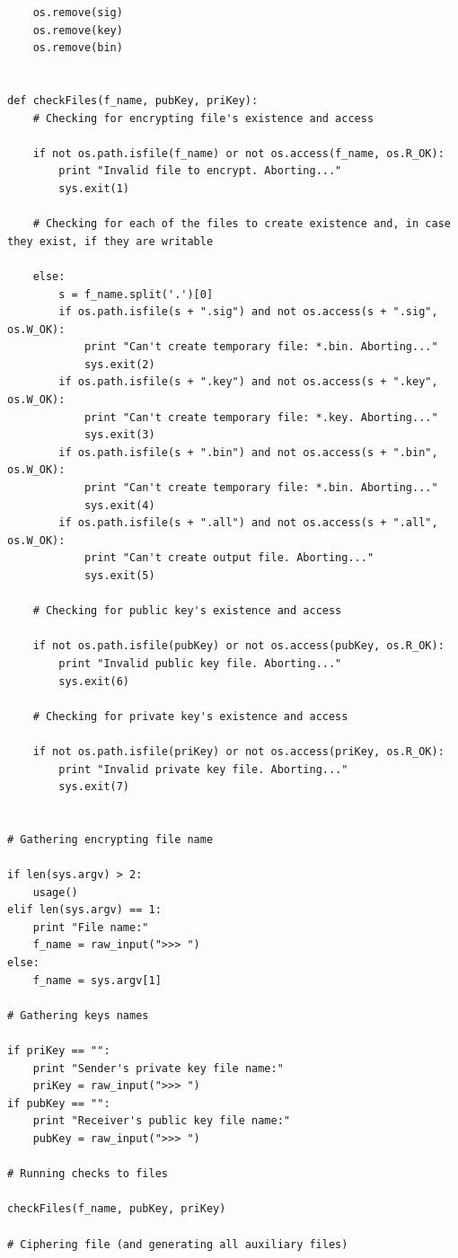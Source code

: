 \documentclass[a4paper,11pt,openright,oneside]{report}
\begin{document}
\begin{appendices}
\begin{verbatim}
    os.remove(sig)
    os.remove(key)
    os.remove(bin)


def checkFiles(f_name, pubKey, priKey):
    # Checking for encrypting file's existence and access

    if not os.path.isfile(f_name) or not os.access(f_name, os.R_OK):
        print "Invalid file to encrypt. Aborting..."
        sys.exit(1)

    # Checking for each of the files to create existence and, in case they exist, if they are writable

    else:
        s = f_name.split('.')[0]
        if os.path.isfile(s + ".sig") and not os.access(s + ".sig", os.W_OK):
            print "Can't create temporary file: *.bin. Aborting..."
            sys.exit(2)
        if os.path.isfile(s + ".key") and not os.access(s + ".key", os.W_OK):
            print "Can't create temporary file: *.key. Aborting..."
            sys.exit(3)
        if os.path.isfile(s + ".bin") and not os.access(s + ".bin", os.W_OK):
            print "Can't create temporary file: *.bin. Aborting..."
            sys.exit(4)
        if os.path.isfile(s + ".all") and not os.access(s + ".all", os.W_OK):
            print "Can't create output file. Aborting..."
            sys.exit(5)

    # Checking for public key's existence and access

    if not os.path.isfile(pubKey) or not os.access(pubKey, os.R_OK):
        print "Invalid public key file. Aborting..."
        sys.exit(6)

    # Checking for private key's existence and access

    if not os.path.isfile(priKey) or not os.access(priKey, os.R_OK):
        print "Invalid private key file. Aborting..."
        sys.exit(7)


# Gathering encrypting file name

if len(sys.argv) > 2:
    usage()
elif len(sys.argv) == 1:
    print "File name:"
    f_name = raw_input(">>> ")
else:
    f_name = sys.argv[1]

# Gathering keys names

if priKey == "":
    print "Sender's private key file name:"
    priKey = raw_input(">>> ")
if pubKey == "":
    print "Receiver's public key file name:"
    pubKey = raw_input(">>> ")

# Running checks to files

checkFiles(f_name, pubKey, priKey)

# Ciphering file (and generating all auxiliary files)


\end{verbatim}
\end{appendices}
\end{document}
